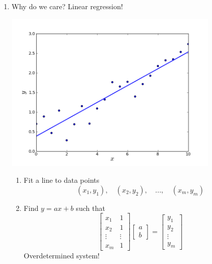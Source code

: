 \documentclass{article}
\theoremstyle{remark}
\begin{document}
\begin{enumerate}
\begin{enumerate}
\item Why do we care? Linear regression!
\begin{center}
\includegraphics[width = 0.8\textwidth]{LR.png}
\end{center}
\begin{enumerate}
\item Fit a line to data points
$$
(x_1,y_1),\quad (x_2,y_2),\quad...,\quad (x_m,y_m)
$$
\item Find $y = ax+b$ such that
$$
\begin{bmatrix}
x_1 & 1\\
x_2 & 1\\
\vdots & \vdots\\
x_m & 1
\end{bmatrix}\begin{bmatrix}
a\\b
\end{bmatrix} = \begin{bmatrix}
y_1\\
y_2\\
\vdots \\
y_m
\end{bmatrix}
$$
Overdetermined system!


\end{enumerate}
\end{enumerate}
\end{enumerate}
\end{document}
